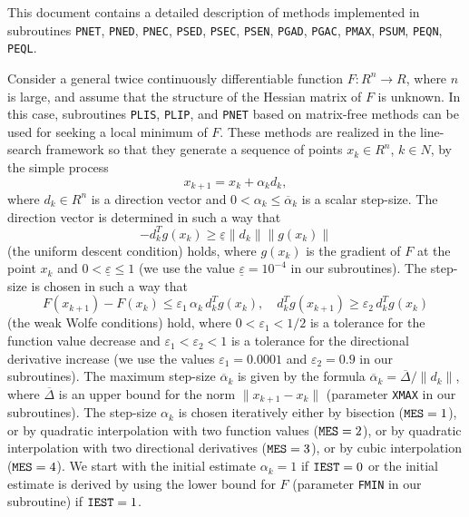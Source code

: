 \documentclass{esub2acm}
\newcommand{\be}{\begin{equation}}
\newcommand{\ee}{\end{equation}}
\begin{document}
\vspace{8mm}


\vspace{3mm}

\noindent This document contains a detailed description of methods implemented
in subroutines {\tt PNET}, {\tt PNED}, {\tt PNEC}, {\tt PSED}, {\tt PSEC},
{\tt PSEN}, {\tt PGAD}, {\tt PGAC}, {\tt PMAX}, {\tt PSUM}, {\tt PEQN},
{\tt PEQL}.


\vspace{8mm}


\vspace{3mm}

\noindent Consider a general twice continuously differentiable
function $F:R^n \to R$, where $n$ is large, and assume that the
structure of the Hessian matrix of $F$ is unknown. In this case,
subroutines {\tt PLIS}, {\tt PLIP}, and {\tt PNET} based on
matrix-free methods can be used for seeking a local minimum of $F$.
These methods are realized in the line-search framework so that
they generate a sequence of points $x_k \in R^n$, $k \in N$,
by the simple process
%
\be
\label{21}
x_{k+1} = x_k + \alpha_k d_k,
\ee
%
where $d_k \in R^n$ is a direction vector and
$0 < \alpha_k \leq \overline{\alpha}_k$ is a scalar step-size.
The direction vector is determined in such a way that
%
\be
\label{20}
-d_k^T g(x_k) \geq \underline{\varepsilon} \|d_k\| \|g(x_k)\|
\ee
%
(the uniform descent condition) holds, where $g(x_k)$ is the gradient
of $F$ at the point $x_k$ and
$0 < \underline{\varepsilon} \leq 1$ (we use the value
$\underline{\varepsilon} = 10^{-4}$ in our subroutines).
The step-size is chosen in such a way that
%
\be
\label{22}
F(x_{k+1}) - F(x_k) \le \varepsilon_1 \, \alpha_k \, d_k^T g(x_k), \quad
d_k^T g(x_{k+1}) \ge \varepsilon_2 \, d_k^T g(x_k)
\ee
%
(the weak Wolfe conditions) hold, where $0< \varepsilon_1 < 1/2$ is a tolerance
for the function value decrease and $\varepsilon_1 < \varepsilon_2 < 1$
is a tolerance for the directional derivative increase (we use the values
$\varepsilon_1 = 0.0001$ and $\varepsilon_2 = 0.9$ in our subroutines).
The maximum step-size $\overline{\alpha}_k$ is given by the formula
$\overline{\alpha}_k = \overline{\Delta}/\|d_k\|$, where
$\overline{\Delta}$ is an upper bound for the norm $\|x_{k+1} - x_k\|$
(parameter {\tt XMAX} in our subroutines). The step-size $\alpha_k$
is chosen iteratively either by bisection (${\tt MES}=1$), or by
quadratic interpolation with two function values (${\tt MES}=2$),
or by quadratic interpolation with two directional derivatives
(${\tt MES}=3$), or by cubic interpolation (${\tt MES}=4$). We
start with the initial estimate $\alpha_k = 1$ if ${\tt IEST}=0$
or the initial estimate is derived by using the lower bound for
$F$ (parameter {\tt FMIN} in our subroutine) if ${\tt IEST}=1$.
\end{document}

